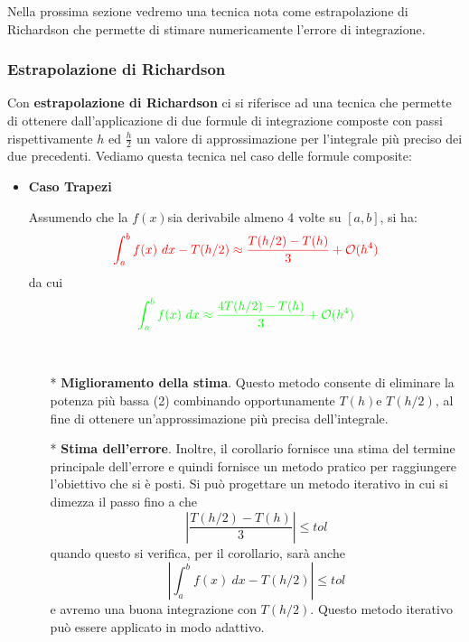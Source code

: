 \documentclass{article}
\begin{document}
Nella prossima sezione vedremo una tecnica nota come estrapolazione di
Richardson che permette di stimare numericamente l'errore di integrazione.
\subsubsection{Estrapolazione di Richardson}
Con \textbf{estrapolazione di Richardson} ci si riferisce ad una tecnica che
permette di ottenere dall'applicazione di due formule di integrazione composte
con passi rispettivamente $h$ ed $\frac{h}{2}$ un valore di approssimazione
per l'integrale più preciso dei due precedenti. Vediamo questa tecnica nel
caso delle formule composite:
\begin{itemize}
    \item \textbf{Caso Trapezi} 
    \begin{corollary}
        Assumendo che la $f(x)$sia derivabile almeno 4 volte su $[a,b]$, si
        ha:
        $${\color{red}\displaystyle\int_{a}^{b}f(x)\ dx-T(h/2)\approx
        \frac{T(h/2)-T(h)}{3}+\mathcal{O}(h^4)}$$
        da cui 
        $${\color{green}\displaystyle\int_{a}^{b}f(x)\ dx\approx
        \frac{4T(h/2)-T(h)}{3}+\mathcal{O}(h^4)}$$
    \end{corollary} 
    \begin{oss}\leavevmode\
        \begin{itemize}
            \item[{\color{green}*}]\textbf{Miglioramento della stima}. Questo metodo consente di eliminare la potenza più bassa (2) 
                combinando opportunamente $T(h)$e $T(h/2)$, al fine di ottenere un'approssimazione
                più precisa dell'integrale.
            \item[{\color{red}*}]\textbf{Stima dell'errore}. Inoltre, il corollario fornisce una stima
                del termine principale dell'errore e quindi fornisce un metodo
                pratico per raggiungere l'obiettivo che si è posti. Si può
                progettare un metodo iterativo in cui si dimezza il passo fino
                a che 
                \begin{equation}\label{eq:stima_errore_integrazione}
                    \left\lvert \frac{T(h/2)-T(h)}{3}\right\rvert\leq tol
                \end{equation} 
                quando questo si verifica, per il corollario, sarà anche 
                $$\left\lvert \displaystyle\int_{a}^{b}f(x)\
                dx-T(h/2)\right\rvert\leq tol$$
                e avremo una buona integrazione con $T(h/2)$. Questo metodo
                iterativo può essere applicato in modo adattivo. 
        \end{itemize}
        
    \end{oss}
\end{itemize}
\end{document}
